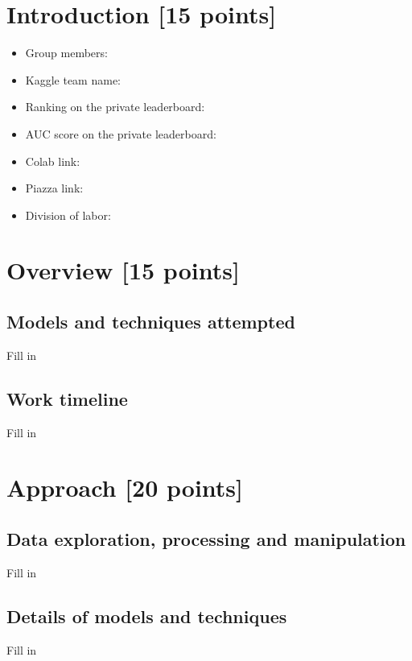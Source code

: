 \pagestyle{fancy}




\newpage

\section{Introduction [15 points]}
    \begin{itemize}
        \item Group members:
        \item Kaggle team name:
        \item Ranking on the private leaderboard:
        \item AUC score on the private leaderboard:
        \item Colab link:
        \item Piazza link:
        \item Division of labor:
    \end{itemize} 
\newpage

\section{Overview [15 points]}
\subsection{Models and techniques attempted}
Fill in

\subsection{Work timeline}
Fill in

\newpage

\section{Approach [20 points]}
\subsection{Data exploration, processing and manipulation}
Fill in

\subsection{Details of models and techniques}
Fill in


